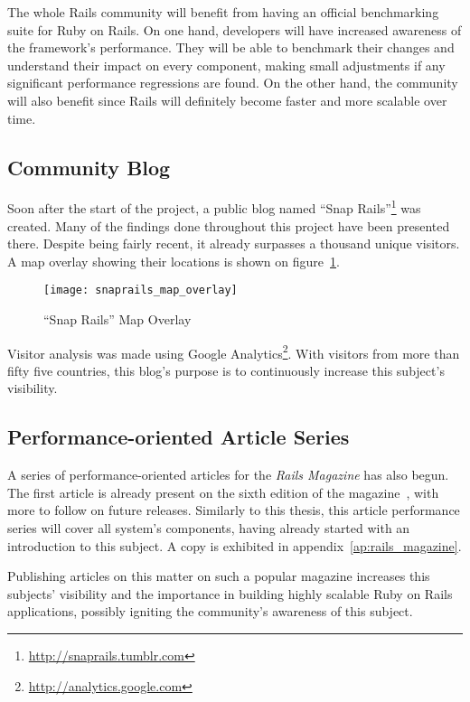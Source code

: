 The whole Rails community will benefit from having an official benchmarking suite for Ruby on Rails. On one hand, developers will have increased awareness of the framework's performance. They will be able to benchmark their changes and understand their impact on every component, making small adjustments if any significant performance regressions are found. On the other hand, the community will also benefit since Rails will definitely become faster and more scalable over time.


\subsection{Community Blog}
Soon after the start of the project, a public blog named ``Snap Rails''\footnote{\url{http://snaprails.tumblr.com}} was created. Many of the findings done throughout this project have been presented there. Despite being fairly recent, it already surpasses a thousand unique visitors. A map overlay showing their locations is shown on figure~\ref{fig:snaprails_map_overlay}.
\begin{figure}[h!t]
  \centering
    \texttt{[image: snaprails\_map\_overlay]}
    \caption{``Snap Rails'' Map Overlay} \label{fig:snaprails_map_overlay}
\end{figure}
Visitor analysis was made using Google Analytics\footnote{\url{http://analytics.google.com}}. With visitors from more than fifty five countries, this blog's purpose is to continuously increase this subject's visibility.


\subsection{Performance-oriented Article Series}
A series of performance-oriented articles for the \textit{Rails Magazine} has also begun. The first article is already present on the sixth edition of the magazine~\cite{rails_magazine_6}, with more to follow on future releases. Similarly to this thesis, this article performance series will cover all system's components, having already started with an introduction to this subject. A copy is exhibited in appendix~\ref{ap:rails_magazine}.

Publishing articles on this matter on such a popular magazine increases this subjects' visibility and the importance in building highly scalable Ruby on Rails applications, possibly igniting the community's awareness of this subject.



